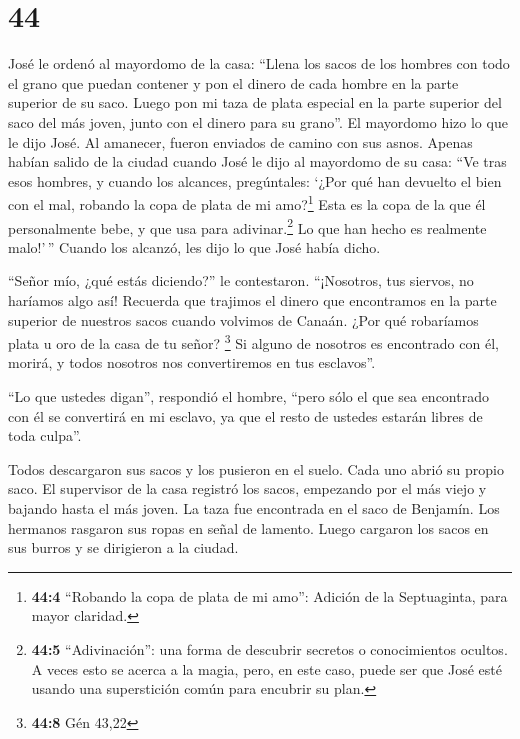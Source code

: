 \hypertarget{section-43}{%
\section{44}\label{section-43}}

 José le ordenó al mayordomo de la casa: ``Llena los sacos
de los hombres con todo el grano que puedan contener y pon el dinero de
cada hombre en la parte superior de su saco.  Luego pon mi
taza de plata especial en la parte superior del saco del más joven,
junto con el dinero para su grano''. El mayordomo hizo lo que le dijo
José.  Al amanecer, fueron enviados de camino con sus
asnos.  Apenas habían salido de la ciudad cuando José le
dijo al mayordomo de su casa: ``Ve tras esos hombres, y cuando los
alcances, pregúntales: `¿Por qué han devuelto el bien con el mal,
robando la copa de plata de mi amo?\footnote{\textbf{44:4} ``Robando la
  copa de plata de mi amo'': Adición de la Septuaginta, para mayor
  claridad.}  Esta es la copa de la que él personalmente
bebe, y que usa para adivinar.\footnote{\textbf{44:5} ``Adivinación'':
  una forma de descubrir secretos o conocimientos ocultos. A veces esto
  se acerca a la magia, pero, en este caso, puede ser que José esté
  usando una superstición común para encubrir su plan.} Lo que han hecho
es realmente malo!'\,''  Cuando los alcanzó, les dijo lo
que José había dicho.

 ``Señor mío, ¿qué estás diciendo?'' le contestaron.
``¡Nosotros, tus siervos, no haríamos algo así!  Recuerda
que trajimos el dinero que encontramos en la parte superior de nuestros
sacos cuando volvimos de Canaán. ¿Por qué robaríamos plata u oro de la
casa de tu señor? \footnote{\textbf{44:8} Gén 43,22}  Si
alguno de nosotros es encontrado con él, morirá, y todos nosotros nos
convertiremos en tus esclavos''.

 ``Lo que ustedes digan'', respondió el hombre, ``pero
sólo el que sea encontrado con él se convertirá en mi esclavo, ya que el
resto de ustedes estarán libres de toda culpa''.

 Todos descargaron sus sacos y los pusieron en el suelo.
Cada uno abrió su propio saco.  El supervisor de la casa
registró los sacos, empezando por el más viejo y bajando hasta el más
joven. La taza fue encontrada en el saco de Benjamín. 
Los hermanos rasgaron sus ropas en señal de lamento. Luego cargaron los
sacos en sus burros y se dirigieron a la ciudad.

